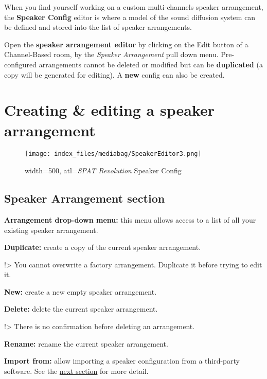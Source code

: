 \documentclass[
  letterpaper,
  DIV=11,
  numbers=noendperiod]{scrreport}
\begin{document}
When you find yourself working on a custom multi-channels speaker
arrangement, the \textbf{Speaker Config} editor is where a model of the
sound diffusion system can be defined and stored into the list of
speaker arrangements.

Open the \textbf{speaker arrangement editor} by clicking on the Edit
button of a Channel-Based room, by the \emph{Speaker Arrangement} pull
down menu. Pre-configured arrangements cannot be deleted or modified but
can be \textbf{duplicated} (a copy will be generated for editing). A
\textbf{new} config can also be created.

\hypertarget{creating-editing-a-speaker-arrangement}{%
\section{Creating \& editing a speaker
arrangement}\label{creating-editing-a-speaker-arrangement}}

\begin{figure}

{\centering \texttt{[image: index\_files/mediabag/SpeakerEditor3.png]}

}

\caption{width=500, atl=\emph{SPAT Revolution} Speaker Config}

\end{figure}

\hypertarget{speaker-arrangement-section}{%
\subsection{Speaker Arrangement
section}\label{speaker-arrangement-section}}

\textbf{Arrangement drop-down menu:} this menu allows access to a list
of all your existing speaker arrangement.

\textbf{Duplicate:} create a copy of the current speaker arrangement.

!\textgreater{} You cannot overwrite a factory arrangement. Duplicate it
before trying to edit it.

\textbf{New:} create a new empty speaker arrangement.

\textbf{Delete:} delete the current speaker arrangement.

!\textgreater{} There is no confirmation before deleting an arrangement.

\textbf{Rename:} rename the current speaker arrangement.

\textbf{Import from:} allow importing a speaker configuration from a
third-party software. See the
\href{Spat_Environment_Import_Speaker_Config.md}{next section} for more
detail.
\end{document}
